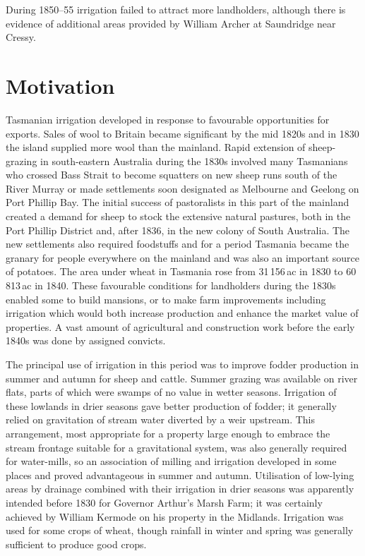 During 1850--55 irrigation failed to attract more landholders,
although there is evidence of additional areas provided by William
Archer at Saundridge near
Cressy.

\section*{Motivation}

Tasmanian irrigation developed in response to favourable opportunities
for exports.  Sales of wool to Britain became significant
by the mid 1820s and in 1830 the island supplied more wool than the
mainland.  Rapid extension of sheep-grazing in south-eastern Australia
during the 1830s involved many Tasmanians who crossed Bass Strait to
become squatters on new sheep runs south of the River
Murray or made settlements soon designated as
Melbourne and Geelong on Port Phillip
Bay. The initial success of pastoralists in
this part of the mainland created a demand for sheep to stock the
extensive natural pastures, both in the Port Phillip District and,
after 1836, in the new colony of South Australia. The new settlements also required foodstuffs and for a
period Tasmania became the granary for people everywhere on the
mainland and was also an important source of potatoes.  The area under
wheat in Tasmania rose from 31\,156\,ac in 1830 to 60\,813\,ac in
1840.  These favourable conditions for landholders during the 1830s
enabled some to build mansions, or to make farm improvements including
irrigation which would both increase production and enhance the market
value of properties.  A vast amount of agricultural and construction
work before the early 1840s was done by assigned
convicts.

The principal use of irrigation in this period was to improve fodder
production in summer and autumn for sheep and cattle. Summer grazing
was available on river flats, parts of which were swamps of no value
in wetter seasons.  Irrigation of these lowlands in drier seasons gave
better production of fodder; it generally relied on gravitation of
stream water diverted by a weir upstream.  This arrangement, most
appropriate for a property large enough to embrace the stream frontage
suitable for a gravitational system, was also generally required for
water-mills, so an association of milling and irrigation developed in
some places and proved advantageous in summer and autumn.  Utilisation
of low-lying areas by drainage combined with their irrigation in drier
seasons was apparently intended before 1830 for Governor Arthur's
Marsh Farm; it was certainly achieved by William Kermode on his
property in the Midlands.  Irrigation was used for some crops of
wheat, though rainfall in winter and spring was generally sufficient
to produce good crops.

